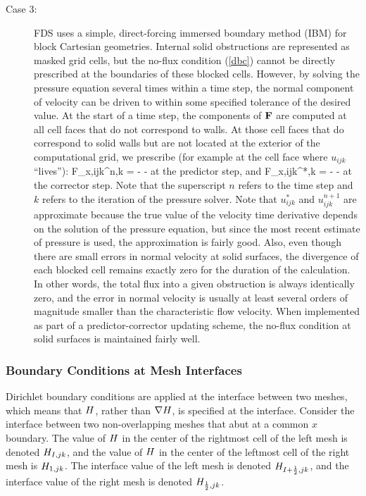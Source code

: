 \begin{description}
\item[Case 3:] FDS uses a simple, direct-forcing immersed boundary method (IBM) \cite{Fadlun:2000} for block Cartesian geometries. Internal solid obstructions are represented as masked grid cells, but the no-flux condition (\ref{dbc}) cannot be directly prescribed at the boundaries of these blocked cells. However, by solving the pressure equation several times within a time step, the normal component of velocity can be driven to within some specified tolerance of the desired value. At the start of a time step, the components of ${\mathbf{F}}$ are computed at all cell faces that do not correspond to walls. At those cell faces that do correspond to solid walls but are not located at the exterior of the computational grid, we prescribe (for example at the cell face where $u_{ijk}$ ``lives''):
\be
F_{x,ijk}^{n,k} = -  -
\label{sbc}
\ee
at the predictor step, and
\be
F_{x,ijk}^{*,k} = -  - 
\label{sbcc}
\ee
at the corrector step. Note that the superscript $n$ refers to the time step and $k$ refers to the iteration of the pressure solver. Note that $u_{ijk}^*$ and $u_{ijk}^{n+1}$ are approximate because the true value of the velocity time derivative depends on the solution of the pressure equation, but since the most recent estimate of pressure is used, the approximation is fairly good. Also, even though there are small errors in normal velocity at solid surfaces, the divergence of each blocked cell remains exactly zero for the duration of the calculation. In other words, the total flux into a given obstruction is always identically zero, and the error in normal velocity is usually at least several orders of magnitude smaller than the characteristic flow velocity. When implemented as part of a predictor-corrector updating scheme, the no-flux condition at solid surfaces is maintained fairly well.
\end{description}


\subsubsection{Boundary Conditions at Mesh Interfaces}
\label{section:mesh_interface}

Dirichlet boundary conditions are applied at the interface between two meshes, which means that $H$, rather than $\nabla H$, is specified at the interface. Consider the interface between two non-overlapping meshes that abut at a common $x$ boundary. The value of $H$ in the center of the rightmost cell of the left mesh is denoted $H_{I,jk}$, and the value of $H$ in the center of the leftmost cell of the right mesh is $H_{1,jk}$. The interface value of the left mesh is denoted $H_{I+\frac{1}{2},jk}$, and the interface value of the right mesh is denoted $H_{\frac{1}{2},jk}$.

